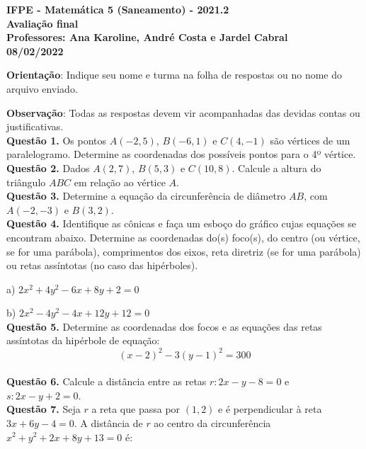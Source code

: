 \documentclass[a4paper, 12pt]{article}
\begin{document}
\begin{center}
\textbf{IFPE - Matemática 5 (Saneamento) - 2021.2 \\ Avaliação final \\ Professores: Ana Karoline, André Costa e Jardel Cabral \\ 08/02/2022}
\end{center}

\noindent \textbf{Orientação}: Indique seu nome e turma na folha de respostas ou no nome do arquivo enviado. 

\noindent \textbf{Observação}: Todas as respostas devem vir acompanhadas das devidas contas ou justificativas. 
\\

\noindent \textbf{Questão 1.} Os pontos \(A(-2, 5)\), \(B(-6, 1)\) e \(C(4, -1)\) são vértices de um paralelogramo. Determine as coordenadas dos possíveis pontos para o 4º vértice.
\\

\noindent \textbf{Questão 2.} Dados \(A(2, 7)\), \(B(5, 3)\) e \(C(10, 8)\). Calcule a altura do triângulo \(ABC\) em relação ao vértice \(A\). 
\\

\noindent \textbf{Questão 3.} Determine a equação da circunferência de diâmetro \(AB\), com \(A(-2, -3)\) e \(B(3, 2)\).
\\

\noindent \textbf{Questão 4.} Identifique as cônicas e faça um esboço do gráfico cujas equações se encontram abaixo. Determine as coordenadas do(s) foco(s), do centro (ou vértice, se for uma parábola), comprimentos dos eixos, reta diretriz (se for uma parábola) ou retas assíntotas (no caso das hipérboles).    

\noindent a) $2x^2 + 4y^2 - 6x + 8y + 2 = 0$

\noindent b) $2x^2 - 4y^2 - 4x + 12y + 12 = 0$
\\

\noindent \textbf{Questão 5.} Determine as coordenadas dos focos e as equações das retas assíntotas da hipérbole de equação:
$$(x - 2)^2 - 3(y - 1)^2 = 300$$
\\

\noindent \textbf{Questão 6.} Calcule a distância entre as retas \(r: 2x - y - 8 = 0\) e \(s: 2x - y + 2 = 0\).
\\

\noindent \textbf{Questão 7.} Seja \(r\) a reta que passa por \((1, 2)\) e é perpendicular à reta \(3x + 6y - 4 = 0\). A distância de \(r\) ao centro da circunferência \(x^2 + y^2 + 2x + 8y + 13 = 0\) é:

 
\end{document}
